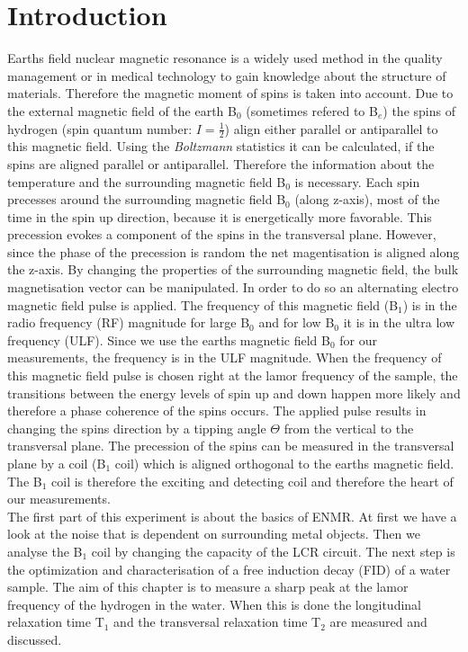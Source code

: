 \section{Introduction}
\label{sec:Introduction}
Earths field nuclear magnetic resonance is a widely used method in the quality management or in medical technology to gain knowledge about the structure of materials. Therefore the magnetic moment of spins is taken into account.\newline
Due to the external magnetic field of the earth B$_0$ (sometimes refered to B$_e$) the spins of hydrogen (spin quantum number: $I=\frac{1}{2}$) align either parallel or antiparallel to this magnetic field. Using the \textit{Boltzmann} statistics it can be calculated, if the spins are aligned parallel or antiparallel. Therefore the information about the temperature and the surrounding magnetic field B$_0$ is necessary. Each spin precesses around the surrounding magnetic field B$_0$ (along z-axis), most of the time in the spin up direction, because it is energetically more favorable. This precession evokes a component of the spins in the transversal plane. However, since the phase of the precession is random the net magentisation is aligned along the z-axis. By changing the properties of the surrounding magnetic field, the bulk magnetisation vector can be manipulated. In order to do so an alternating electro magnetic field pulse is applied. The frequency of this magnetic field (B$_1$) is in the radio frequency (RF) magnitude for large B$_0$ and for low B$_0$ it is in the ultra low frequency (ULF). Since we use the earths magnetic field B$_0$ for our measurements, the frequency is in the ULF magnitude. When the frequency of this magnetic field pulse is chosen right at the lamor frequency of the sample, the transitions between the energy levels of spin up and down happen more likely and therefore a phase coherence of the spins occurs. The applied pulse results in changing the spins direction by a tipping angle $\Theta$ from the vertical to the transversal plane. The precession of the spins can be measured in the transversal plane by a coil (B$_1$ coil) which is aligned orthogonal to the earths magnetic field. The B$_1$ coil is therefore the exciting and detecting coil and therefore the heart of our measurements. \\
The first part of this experiment is about the basics of ENMR. At first we have a look at the noise that is dependent on surrounding metal objects. Then we analyse the B$_1$ coil by changing the capacity of the LCR circuit. The next step is the optimization and characterisation of a free induction decay (FID) of a water sample. The aim of this chapter is to measure a sharp peak at the lamor frequency of the hydrogen in the water. When this is done the longitudinal relaxation time T$_1$ and the transversal relaxation time T$_2$ are measured and discussed.
